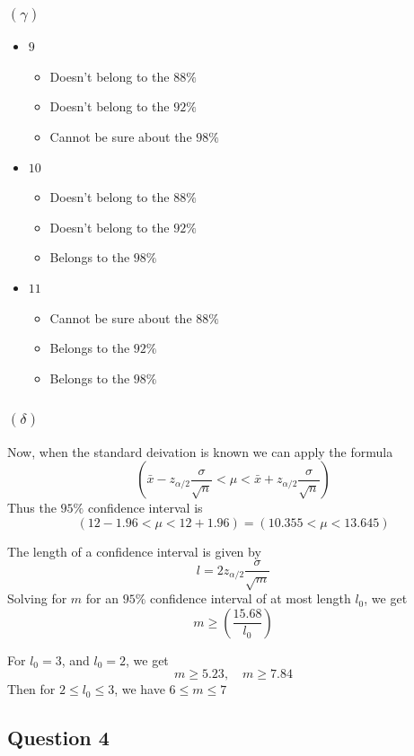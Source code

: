 \documentclass{article}
\begin{document}
\subsubsection*{\((\gamma)\)}
\begin{itemize}
	\item \(9\)
	      \begin{itemize}
		      \item Doesn't belong to the \(88\%\)
		      \item Doesn't belong to the \(92\%\)
		      \item Cannot be sure about the \(98\%\)
	      \end{itemize}
	\item \(10\)
	      \begin{itemize}
		      \item Doesn't belong to the \(88\%\)
		      \item Doesn't belong to the \(92\%\)
		      \item Belongs to the \(98\%\)
	      \end{itemize}
	\item \(11\)
	      \begin{itemize}
		      \item Cannot be sure about the \(88\%\)
		      \item Belongs to the \(92\%\)
		      \item Belongs to the \(98\%\)
	      \end{itemize}
\end{itemize}

\subsubsection*{\((\delta)\)}
Now, when the standard deivation is known we can apply the formula
\[
	(\bar{x} - z_{\alpha/2}\frac{\sigma}{\sqrt{n}} < \mu < \bar{x} + z_{\alpha/2}\frac{\sigma}{\sqrt{n}} )
\]
Thus the \(95\%\) confidence interval is
\[
	(12 - 1.96 < \mu < 12 + 1.96) = (10.355 < \mu < 13.645)
\]

The length of a confidence interval is given by
\[
	l = 2z_{\alpha/2}\frac{\sigma}{\sqrt{m}}
\]
Solving for \(m\) for an \(95\%\) confidence interval of at most length \(l_0\), we get
\[
	m \geq \left(\frac{15.68}{l_0}\right)
\]

For \(l_0 = 3\), and \(l_0 = 2\), we get
\[
	m \geq 5.23, \quad m \geq 7.84
\]
Then for \(2\leq l_0 \leq 3\), we have \( 6 \leq m \leq 7\)

\subsection*{Question 4}
\end{document}
